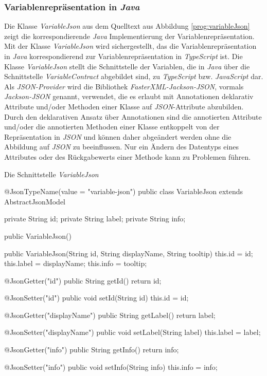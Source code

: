 \subsubsection{Variablenrepräsentation in \emph{Java}}
Die Klasse \emph{VariableJson} aus dem Quelltext aus Abbildung \ref{prog:variableJson} zeigt die korrespondierende \emph{Java} Implementierung der Variablenrepräsentation. Mit der Klasse \emph{VariableJson} wird sichergestellt, das die Variablenrepräsentation in \emph{Java} korrespondierend zur Variablenrepräsentation in \emph{TypeScript} ist. Die Klasse \emph{VariableJson} stellt die Schnittstelle der Variablen, die in \emph{Java} über die Schnittstelle \emph{VariableContract} abgebildet sind, zu \emph{TypeScript} bzw. \emph{JavaScript} dar. Als \emph{JSON-Provider} wird die Bibliothek \emph{FasterXML-Jackson-JSON}, vormals \emph{Jackson-JSON} genannt, verwendet, die es erlaubt mit Annotationen deklarativ Attribute und/oder Methoden einer Klasse auf \emph{JSON}-Attribute abzubilden. Durch den deklarativen Ansatz über Annotationen sind die annotierten  Attribute und/oder die annotierten Methoden einer Klasse entkoppelt von der Repräsentation in \emph{JSON} und können daher abgeändert werden ohne die Abbildung auf \emph{JSON} zu beeinflussen. Nur ein Ändern des Datentyps eines Attributes oder des Rückgabewerts einer Methode kann zu Problemen führen. 
\newline
\begin{program}
\caption{Die Schnittstelle \emph{VariableJson}}
\label{prog:variableJson}
\begin{JsCode}
@JsonTypeName(value = "variable-json")
public class VariableJson extends AbstractJsonModel {

    private String id;
    private String label;
    private String info;

    public VariableJson() {
    }

    public VariableJson(String id, 
                        String displayName, 
                        String tooltip) {
        this.id = id;
        this.label = displayName;
        this.info = tooltip;
    }

    @JsonGetter("id")
    public String getId() { 
        return id; 
    }

    @JsonSetter("id")
    public void setId(String id) { 
        this.id = id; 
    }

    @JsonGetter("displayName")
    public String getLabel() { 
        return label; 
    }

    @JsonSetter("displayName")
    public void setLabel(String label) { 
        this.label = label; 
    }

    @JsonGetter("info")
    public String getInfo() { 
        return info; 
    }

    @JsonSetter("info")
    public void setInfo(String info) { 
        this.info = info; 
    }
}
\end{JsCode}
\end{program}
\ \newline

